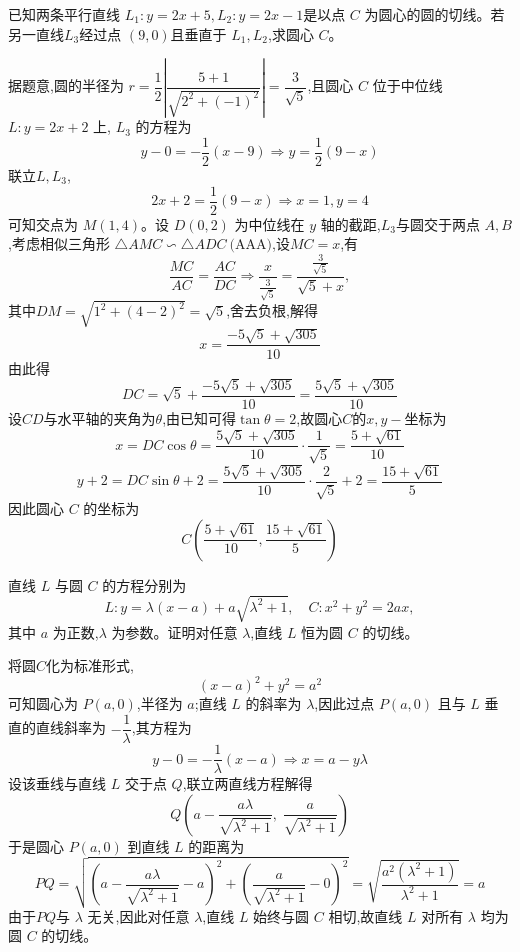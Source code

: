 \begin{questions}
    \question 已知两条平行直线 $L_1:y = 2x + 5,L_2:y = 2x - 1$是以点 $C$ 为圆心的圆的切线。若另一直线$L_3$经过点 $(9,0)$且垂直于 $L_1,L_2$,求圆心 $C$。
    \begin{solution}
        据题意,圆的半径为 $r = \dfrac{1}{2}\left|\dfrac{5+1}{\sqrt{2^2+(-1)^2}}\right|= \dfrac{3}{\sqrt{5}}$,且圆心 $C$ 位于中位线 $L:y = 2x + 2$ 上, $L_3$ 的方程为
        \[ 
        y - 0 = -\frac{1}{2}(x - 9) \Rightarrow y = \frac{1}{2}(9 - x) 
        \]
        联立$L,L_3$,
        \[ 
        2x + 2 = \frac{1}{2}(9 - x) \Rightarrow x = 1, y=4
        \]
        可知交点为 $M(1,4)$。设 $D(0,2)$ 为中位线在 $y$ 轴的截距,$L_3$与圆交于两点 $A, B$,考虑相似三角形 $\triangle AMC \backsim \triangle ADC \ \text{(AAA)}$,设$MC = x$,有
        \[
        \frac{MC}{AC} = \frac{AC}{DC} \Rightarrow \frac{x}{\frac{3}{\sqrt{5}}} = \frac{\frac{3}{\sqrt{5}}}{\sqrt{5} + x} ,
        \]
        其中$DM = \sqrt{1^2 + (4-2)^2} = \sqrt{5}$,舍去负根,解得
        \[ 
        x = \frac{-5\sqrt{5} + \sqrt{305}}{10} 
        \]
        由此得 
        \[
        DC = \sqrt{5} + \frac{-5\sqrt{5} + \sqrt{305}}{10} = \frac{5\sqrt{5} + \sqrt{305}}{10}
        \]
        设$CD$与水平轴的夹角为$\theta$,由已知可得$\tan \theta=2$,故圆心$C$的$x,y-$坐标为
        \[ 
        x = DC \cos \theta = \frac{5\sqrt{5} + \sqrt{305}}{10}\cdot \frac{1}{\sqrt{5}} = \frac{5 + \sqrt{61}}{10}
        \]
        \[ 
        y+2 = DC \sin \theta + 2 = \frac{5\sqrt{5} + \sqrt{305}}{10} \cdot \frac{2}{\sqrt{5}} + 2 = \frac{15 + \sqrt{61}}{5} 
        \]
        因此圆心 $C$ 的坐标为
        \[ 
        C\left( \frac{5 + \sqrt{61}}{10}, \frac{15 + \sqrt{61}}{5} \right) 
        \]
    \end{solution}

    \question 直线 $L$ 与圆 $C$ 的方程分别为
    \[
    L: y=\lambda(x-a)+a\sqrt{\lambda^{2}+1},\quad
    C: x^{2}+y^{2}=2ax,
    \]
    其中 $a$ 为正数,$\lambda$ 为参数。证明对任意 $\lambda$,直线 $L$ 恒为圆 $C$ 的切线。
    \begin{solution}
        将圆$C$化为标准形式,
        \[
        (x-a)^{2}+y^{2} = a^{2}
        \]
        可知圆心为 $P(a,0)$,半径为 $a$;直线 $L$ 的斜率为 $\lambda$,因此过点 $P(a,0)$ 且与 $L$ 垂直的直线斜率为 $-\dfrac{1}{\lambda}$,其方程为
        \[
        y-0 = -\frac{1}{\lambda}(x-a) \Rightarrow x = a-y\lambda
        \]
        设该垂线与直线 $L$ 交于点 $Q$,联立两直线方程解得
        \[
        Q\left(a-\frac{a\lambda}{\sqrt{\lambda^{2}+1}},\;\frac{a}{\sqrt{\lambda^{2}+1}}\right)
        \]
        于是圆心 $P(a,0)$ 到直线 $L$ 的距离为
        \[
        PQ=\sqrt{\left(a-\frac{a\lambda}{\sqrt{\lambda^{2}+1}}-a\right)^{2}+\left(\frac{a}{\sqrt{\lambda^{2}+1}}-0\right)^{2}} 
        =\sqrt{\frac{a^{2}(\lambda^{2}+1)}{\lambda^{2}+1}} 
        =a
        \]
        由于$PQ$与 $\lambda$ 无关,因此对任意 $\lambda$,直线 $L$ 始终与圆 $C$ 相切,故直线 $L$ 对所有 $\lambda$ 均为圆 $C$ 的切线。
    \end{solution}


\end{questions}
